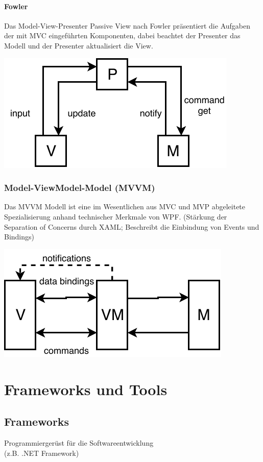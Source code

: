 \documentclass
[
	8pt,		%
	ngerman,	%
	a4paper,	%
	landscape,	%
	final		%
]{extarticle}
\begin{document}
\begin{multicols*}{4}
	\paragraph{Fowler}
	Das Model-View-Presenter Passive View nach Fowler präsentiert die Aufgaben
	der mit MVC eingeführten Komponenten, dabei beachtet der Presenter das Modell
	und der Presenter aktualisiert die View.
	\begin{center}
		\includegraphics[width=0.7\linewidth]{./Documents/Graphics/DiagramMVPFowler.pdf}
	\end{center}
	\subsubsection{Model-ViewModel-Model (MVVM)}
	Das MVVM Modell ist eine im Wesentlichen aus MVC und MVP abgeleitete
	Spezialisierung anhand technischer Merkmale von WPF.
	(Stärkung der Separation of Concerns durch XAML; Beschreibt die Einbindung
	von Events und Bindings)
	\begin{center}
		\includegraphics[width=0.7\linewidth]{./Documents/Graphics/DiagramMVVM.pdf}
	\end{center}
	\section{Frameworks und Tools}
	\subsection{Frameworks}
	Programmiergerüst für die Softwareentwicklung\\
	(z.B. .NET Framework)

\end{multicols*}
\end{document}
